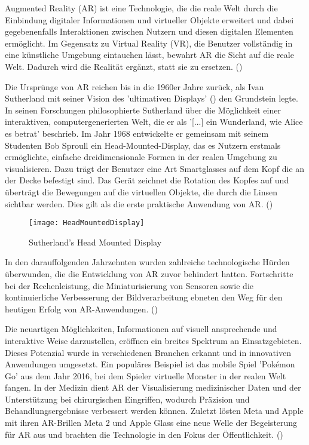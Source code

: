 Augmented Reality (AR) ist eine Technologie, die die reale Welt durch die Einbindung digitaler Informationen und virtueller Objekte erweitert und dabei gegebenenfalls Interaktionen zwischen Nutzern und diesen digitalen Elementen ermöglicht. Im Gegensatz zu Virtual Reality (VR), die Benutzer vollständig in eine künstliche Umgebung eintauchen lässt, bewahrt AR die Sicht auf die reale Welt. Dadurch wird die Realität ergänzt, statt sie zu ersetzen. (\cite{Azuma.1997})

Die Ursprünge von AR reichen bis in die 1960er Jahre zurück, als Ivan Sutherland mit seiner Vision des 'ultimativen Displays' (\citet{Sutherland.1965}) den Grundstein legte. In seinen Forschungen philosophierte Sutherland über die Möglichkeit einer interaktiven, computergenerierten Welt, die er als '[...] ein Wunderland, wie Alice es betrat' beschrieb. Im Jahr 1968 entwickelte er gemeinsam mit seinem Studenten Bob Sproull ein Head-Mounted-Display, das es Nutzern erstmals ermöglichte, einfache dreidimensionale Formen in der realen Umgebung zu visualisieren. Dazu trägt der Benutzer eine Art Smartglasses auf dem Kopf die an der Decke befestigt sind. Das Gerät zeichnet die Rotation des Kopfes auf und überträgt die Bewegungen auf die virtuellen Objekte, die durch die Linsen sichtbar werden. Dies gilt als die erste praktische Anwendung von AR. (\cite{Sutherland.1968, doerner2022virtual})

\begin{figure}
    \centering
    \texttt{[image: HeadMountedDisplay]}
    \caption{Sutherland's Head Mounted Display\label{fig:HeadMountedDisplay}}\par
\end{figure}

In den darauffolgenden Jahrzehnten wurden zahlreiche technologische Hürden überwunden, die die Entwicklung von AR zuvor behindert hatten. Fortschritte bei der Rechenleistung, die Miniaturisierung von Sensoren sowie die kontinuierliche Verbesserung der Bildverarbeitung ebneten den Weg für den heutigen Erfolg von AR-Anwendungen. (\cite{doerner2022virtual})

Die neuartigen Möglichkeiten, Informationen auf visuell ansprechende und interaktive Weise darzustellen, eröffnen ein breites Spektrum an Einsatzgebieten. Dieses Potenzial wurde in verschiedenen Branchen erkannt und in innovativen Anwendungen umgesetzt. Ein populäres Beispiel ist das mobile Spiel 'Pokémon Go' aus dem Jahr 2016, bei dem Spieler virtuelle Monster in der realen Welt fangen. In der Medizin dient AR der Visualisierung medizinischer Daten und der Unterstützung bei chirurgischen Eingriffen, wodurch Präzision und Behandlungsergebnisse verbessert werden können. Zuletzt lösten Meta und Apple mit ihren AR-Brillen Meta 2 und Apple Glass eine neue Welle der Begeisterung für AR aus und brachten die Technologie in den Fokus der Öffentlichkeit. (\cite{doerner2022virtual, boulanger2024applications})

